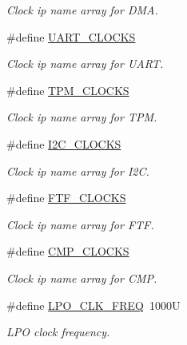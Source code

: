 \begin{DoxyCompactItemize}
\begin{DoxyCompactList}\small\item\em Clock ip name array for D\+MA. \end{DoxyCompactList}\item 
\#define \mbox{\hyperlink{group__clock_gae6c5e4d33e80e2bc367249c46377ee95}{U\+A\+R\+T\+\_\+\+C\+L\+O\+C\+KS}}
\begin{DoxyCompactList}\small\item\em Clock ip name array for U\+A\+RT. \end{DoxyCompactList}\item 
\#define \mbox{\hyperlink{group__clock_ga2a494ed25b8cb9bd9c5a14f590ee8cb8}{T\+P\+M\+\_\+\+C\+L\+O\+C\+KS}}
\begin{DoxyCompactList}\small\item\em Clock ip name array for T\+PM. \end{DoxyCompactList}\item 
\#define \mbox{\hyperlink{group__clock_gac0c74371f4f724c78ef233de79c3cf14}{I2\+C\+\_\+\+C\+L\+O\+C\+KS}}
\begin{DoxyCompactList}\small\item\em Clock ip name array for I2C. \end{DoxyCompactList}\item 
\#define \mbox{\hyperlink{group__clock_ga7424481c4167462b8b5814485b967280}{F\+T\+F\+\_\+\+C\+L\+O\+C\+KS}}
\begin{DoxyCompactList}\small\item\em Clock ip name array for F\+TF. \end{DoxyCompactList}\item 
\#define \mbox{\hyperlink{group__clock_ga5f418050b0df19bdee898d90c504b8c7}{C\+M\+P\+\_\+\+C\+L\+O\+C\+KS}}
\begin{DoxyCompactList}\small\item\em Clock ip name array for C\+MP. \end{DoxyCompactList}\item 
\mbox{\label{group__clock_ga8f4a4e93b0c473d5f1c6bc8dad73acab}} 
\#define \mbox{\hyperlink{group__clock_ga8f4a4e93b0c473d5f1c6bc8dad73acab}{L\+P\+O\+\_\+\+C\+L\+K\+\_\+\+F\+R\+EQ}}~1000U
\begin{DoxyCompactList}\small\item\em L\+PO clock frequency. \end{DoxyCompactList}\item 
\mbox{\label{group__clock_gab3a7892b9f9fbb5c3fc2cbdbceb10017}} 

\end{DoxyCompactItemize}
